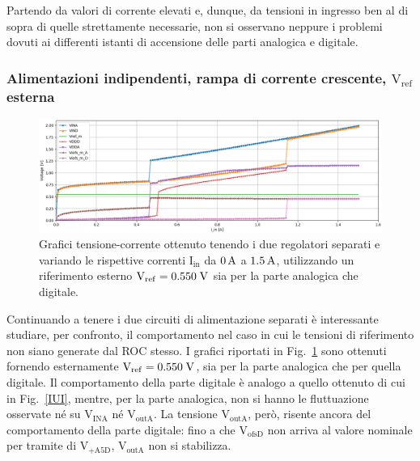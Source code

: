 Partendo da valori di corrente elevati e, dunque, da tensioni in ingresso ben al di sopra di quelle strettamente necessarie, non si osservano neppure i problemi dovuti ai differenti istanti di accensione delle parti analogica e digitale.
% 
%
%

\subsubsection{Alimentazioni indipendenti, rampa di corrente crescente, $\mathrm{V_{ref}}$ esterna} 

\begin{figure}
\centering
\includegraphics[width=\textwidth]{Immagini/IUEVref2}
\caption{Grafici tensione-corrente ottenuto tenendo i due regolatori separati e variando le rispettive correnti $\mathrm{I_{in}}$ da $0\rm \, A$ a $1.5\rm \, A$, utilizzando un riferimento esterno $\mathrm{V_{ref}}=0.550 \rm \; V$ sia per la parte analogica che digitale.}
\label{IUEVref}
\end{figure}
Continuando a tenere i due circuiti di alimentazione separati è interessante studiare, per confronto, il comportamento nel caso in cui le tensioni di riferimento non siano generate dal ROC stesso.
I grafici riportati in Fig.~\ref{IUEVref} sono ottenuti fornendo esternamente $\mathrm{V_{ref}}=0.550\rm \; V$,  sia per la parte analogica che per quella digitale.
Il comportamento della parte digitale è analogo a quello ottenuto di cui in Fig.~\ref{IUI}, mentre, per la parte analogica, non si hanno le fluttuazione osservate n\'e su $\mathrm{V_{INA}}$ n\'e $\mathrm{V_{outA}}$. La tensione $\mathrm{V_{outA}}$, però, risente ancora del comportamento della parte digitale: fino a che $\mathrm{V_{ofsD}}$ non arriva al valore nominale per tramite di $\mathrm{V_{+A5D}}$, $\mathrm{V_{outA}}$ non si stabilizza.

